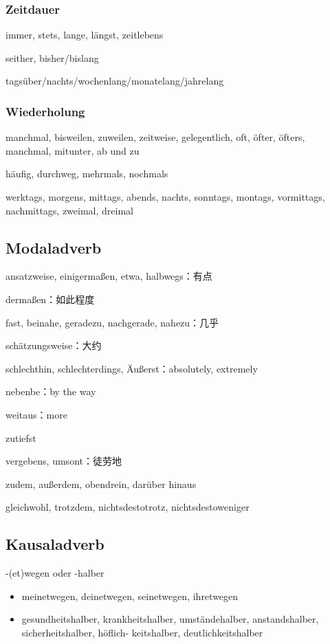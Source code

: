 \documentclass[UTF8]{report}
\begin{document}
\subsubsection{Zeitdauer}
immer, stets, lange, längst, zeitlebens

seither, bisher/bislang

tagsüber/nachts/wochenlang/monatelang/jahrelang

\subsubsection{Wiederholung}
manchmal, bisweilen, zuweilen, zeitweise, gelegentlich, oft, öfter, öfters, manchmal, mitunter, ab und zu

häufig, durchweg, mehrmals, nochmals

werktags, morgens, mittags, abends, nachts, sonntags, montags, vormittags, nachmittags, zweimal, dreimal


\subsection{Modaladverb}
ansatzweise, einigermaßen, etwa, halbwegs：有点

dermaßen：如此程度

fast, beinahe, geradezu, nachgerade, nahezu：几乎

schätzungsweise：大约

schlechthin, schlechterdings, Äußerst：absolutely, extremely

nebenbe：by the way

weitaus：more

zutiefst

vergebens, umsont：徒劳地

zudem, außerdem, obendrein, darüber hinaus

gleichwohl, trotzdem, nichtsdestotrotz, nichtsdestoweniger

\subsection{Kausaladverb}
-(et)wegen oder -halber
\begin{itemize}
    \item meinetwegen, deinetwegen, seinetwegen, ihretwegen
    \item gesundheitshalber, krankheitshalber, umständehalber, anstandshalber, sicherheitshalber, höflich- keitshalber, deutlichkeitshalber
\end{itemize}
\end{document}
